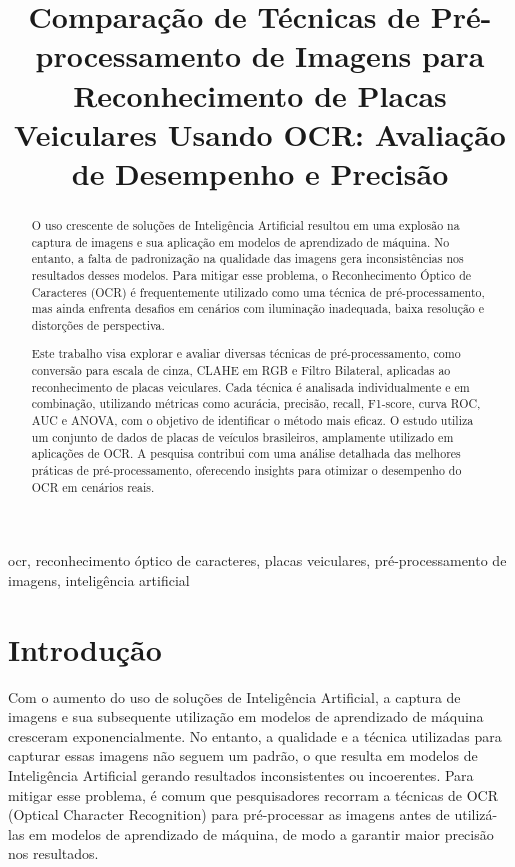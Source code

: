 \documentclass[conference]{IEEEtran}
\begin{document}
\title{Comparação de Técnicas de Pré-processamento de Imagens para Reconhecimento de Placas Veiculares Usando OCR: Avaliação de Desempenho e Precisão}

\author{
}

\maketitle

\begin{abstract}
O uso crescente de soluções de Inteligência Artificial resultou em uma explosão na captura de imagens e sua aplicação em modelos de aprendizado de máquina. No entanto, a falta de padronização na qualidade das imagens gera inconsistências nos resultados desses modelos. Para mitigar esse problema, o Reconhecimento Óptico de Caracteres (OCR) é frequentemente utilizado como uma técnica de pré-processamento, mas ainda enfrenta desafios em cenários com iluminação inadequada, baixa resolução e distorções de perspectiva.

Este trabalho visa explorar e avaliar diversas técnicas de pré-processamento, como conversão para escala de cinza, CLAHE em RGB e Filtro Bilateral, aplicadas ao reconhecimento de placas veiculares. Cada técnica é analisada individualmente e em combinação, utilizando métricas como acurácia, precisão, recall, F1-score, curva ROC, AUC e ANOVA, com o objetivo de identificar o método mais eficaz. O estudo utiliza um conjunto de dados de placas de veículos brasileiros, amplamente utilizado em aplicações de OCR. A pesquisa contribui com uma análise detalhada das melhores práticas de pré-processamento, oferecendo insights para otimizar o desempenho do OCR em cenários reais.
\end{abstract}

\begin{IEEEkeywords} 
ocr, reconhecimento óptico de caracteres, placas veiculares, pré-processamento de imagens, inteligência artificial
\end{IEEEkeywords}

\section{Introdução}
Com o aumento do uso de soluções de Inteligência Artificial, a captura de imagens e sua subsequente utilização em modelos de aprendizado de máquina cresceram exponencialmente. No entanto, a qualidade e a técnica utilizadas para capturar essas imagens não seguem um padrão, o que resulta em modelos de Inteligência Artificial gerando resultados inconsistentes ou incoerentes. Para mitigar esse problema, é comum que pesquisadores recorram a técnicas de OCR (Optical Character Recognition) para pré-processar as imagens antes de utilizá-las em modelos de aprendizado de máquina, de modo a garantir maior precisão nos resultados.
\end{document}
